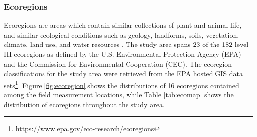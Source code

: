 \def\year{2017}\relax \documentclass[letterpaper]{article}
\begin{document}
\subsubsection{Ecoregions}
Ecoregions are areas which contain similar collections of plant and animal life, and similar ecological conditions such as geology, landforms, soils, vegetation, climate, land use, and water resources \cite{omernik2014ecoregions, salequzzaman2005ecoregions, ce1997ecological}.  
The study area spans 23 of the 182 level III ecoregions as defined by the U.S. Environmental Protection Agency (EPA) and the Commission for Environmental Cooperation (CEC). The ecoregion classifications for the study area were retrieved from the EPA hosted GIS data sets\footnote{\url{https://www.epa.gov/eco-research/ecoregions}}. Figure \ref{fig:ecoregion} shows the distributions of 16 ecoregions contained among the field measurement locations, while Table \ref{tab:ecomap} shows the distribution of ecoregions throughout the study area.
\end{document}
